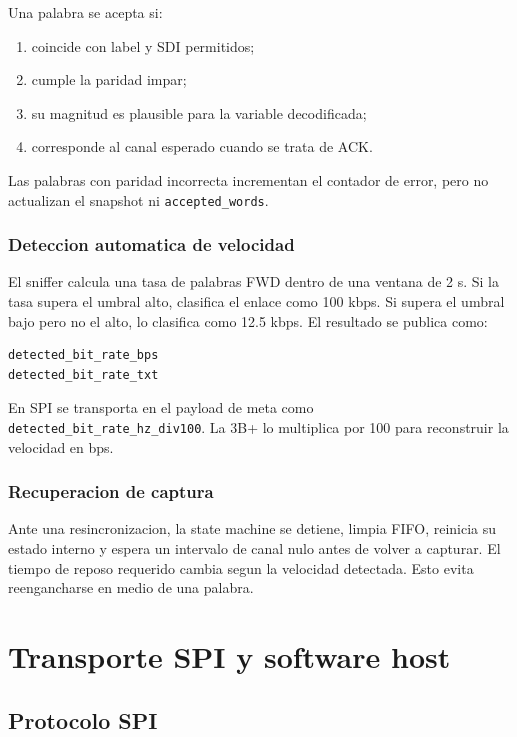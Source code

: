 \documentclass[12pt,a4paper,oneside]{report}
\begin{document}
Una palabra se acepta si:

\begin{enumerate}
  \item coincide con label y SDI permitidos;
  \item cumple la paridad impar;
  \item su magnitud es plausible para la variable decodificada;
  \item corresponde al canal esperado cuando se trata de ACK.
\end{enumerate}

Las palabras con paridad incorrecta incrementan el contador de error, pero no
actualizan el snapshot ni \texttt{accepted\_words}.

\subsection{Deteccion automatica de velocidad}

El sniffer calcula una tasa de palabras FWD dentro de una ventana de 2 s. Si la
tasa supera el umbral alto, clasifica el enlace como 100 kbps. Si supera el
umbral bajo pero no el alto, lo clasifica como 12.5 kbps. El resultado se
publica como:

\begin{lstlisting}
detected_bit_rate_bps
detected_bit_rate_txt
\end{lstlisting}

En SPI se transporta en el payload de meta como
\texttt{detected\_bit\_rate\_hz\_div100}. La 3B+ lo multiplica por 100 para
reconstruir la velocidad en bps.

\subsection{Recuperacion de captura}

Ante una resincronizacion, la state machine se detiene, limpia FIFO, reinicia
su estado interno y espera un intervalo de canal nulo antes de volver a
capturar. El tiempo de reposo requerido cambia segun la velocidad detectada.
Esto evita reengancharse en medio de una palabra.

\chapter{Transporte SPI y software host}

\section{Protocolo SPI}
\end{document}
